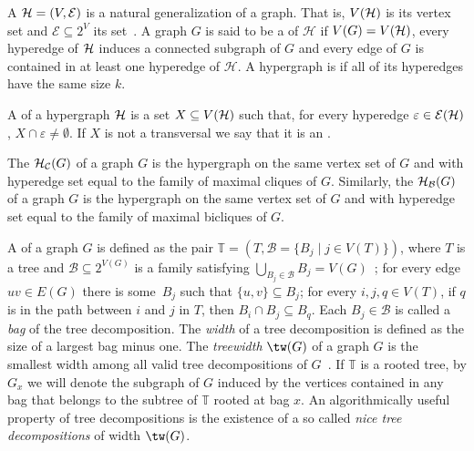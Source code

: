 A  $\mathcal{H} = (V, \mathcal{E})$ is a natural generalization of a graph.
That is, $V(\mathcal{H})$ is its vertex set and $\mathcal{E} \subseteq 2^{V}$ its  set~\citep{hypergraphs}.
A graph $G$ is said to be a  of $\mathcal{H}$ if $V(G) = V(\mathcal{H})$, every hyperedge of $\mathcal{H}$ induces a connected subgraph of $G$ and every edge of $G$ is contained in at least one hyperedge of $\mathcal{H}$.
A hypergraph is  if all of its hyperedges have the same size $k$.

A  of a hypergraph $\mathcal{H}$ is a set $X \subseteq V(\mathcal{H})$ such that, for every hyperedge $\varepsilon \in \mathcal{E}(\mathcal{H})$, $X \cap \varepsilon \neq \emptyset$.
If $X$ is not a transversal we say that it is an .

The  $\mathcal{H}_{\mathcal{C}}(G)$ of a graph $G$ is the hypergraph on the same vertex set of $G$ and with hyperedge set equal to the family of maximal cliques of $G$.
Similarly, the  $\mathcal{H}_{\mathcal{B}}(G)$ of a graph $G$ is the hypergraph on the same vertex set of $G$ and with hyperedge set equal to the family of maximal bicliques of $G$.

A  of a graph $G$ is defined as the pair $\mathbb{T} = \left(T, \mathcal{B} = \{B_j \mid j \in V(T)\}\right)$, where $T$ is a tree and $\mathcal{B} \subseteq 2^{V(G)}$ is a family satisfying $\bigcup_{B_j \in \mathcal{B}} B_j = V(G)$~\citep{treewidth};
for every edge $uv \in E(G)$ there is some~$B_j$ such that $\{u,v\} \subseteq B_j$;
for every $i,j,q \in V(T)$, if $q$ is in the path between $i$ and $j$ in $T$, then $B_i \cap B_j \subseteq B_q$.
Each $B_j \in \mathcal{B}$ is called a \emph{bag} of the tree decomposition.
The \emph{width} of a tree decomposition is defined as the size of a largest bag minus one.
The \emph{treewidth} $\tw(G)$ of a graph $G$ is the smallest width among all valid tree decompositions of $G$~\citep{downey_fellows}.
If $\mathbb{T}$ is a rooted tree, by $G_x$ we will denote the subgraph of $G$ induced by the vertices contained in any bag that belongs to the subtree of $\mathbb{T}$ rooted at bag $x$.
An algorithmically useful property of tree decompositions is the existence of a so called \emph{nice tree decompositions} of width $\tw(G)$.

